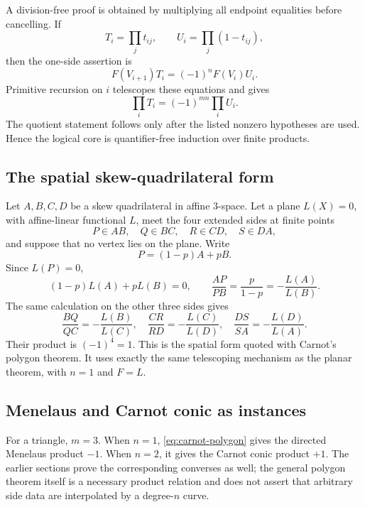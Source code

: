 A division-free proof is obtained by multiplying all endpoint equalities before
cancelling.  If
\[
 T_i=\prod_j t_{ij},\qquad U_i=\prod_j(1-t_{ij}),
\]
then the one-side assertion is
\[
 F(V_{i+1})T_i=(-1)^nF(V_i)U_i.
\]
Primitive recursion on $i$ telescopes these equations and gives
\[
 \prod_iT_i=(-1)^{mn}\prod_iU_i.
\]
The quotient statement follows only after the listed nonzero hypotheses are
used.  Hence the logical core is quantifier-free induction over finite
products.

\subsection{The spatial skew-quadrilateral form}

Let $A,B,C,D$ be a skew quadrilateral in affine $3$-space.  Let a plane
$L(X)=0$, with affine-linear functional $L$, meet the four extended sides at
finite points
\[
 P\in AB,
 \quad Q\in BC,
 \quad R\in CD,
 \quad S\in DA,
\]
and suppose that no vertex lies on the plane.  Write
\[
 P=(1-p)A+pB.
\]
Since $L(P)=0$,
\[
 (1-p)L(A)+pL(B)=0,
 \qquad
 \frac{AP}{PB}=\frac p{1-p}=-\frac{L(A)}{L(B)}.
\]
The same calculation on the other three sides gives
\[
 \frac{BQ}{QC}=-\frac{L(B)}{L(C)},\quad
 \frac{CR}{RD}=-\frac{L(C)}{L(D)},\quad
 \frac{DS}{SA}=-\frac{L(D)}{L(A)}.
\]
Their product is $(-1)^4=1$.  This is the spatial form quoted with Carnot's
polygon theorem.  It uses exactly the same telescoping mechanism as the planar
theorem, with $n=1$ and $F=L$.

\subsection{Menelaus and Carnot conic as instances}

For a triangle, $m=3$.  When $n=1$, \eqref{eq:carnot-polygon} gives the
directed Menelaus product $-1$.  When $n=2$, it gives the Carnot conic product
$+1$.  The earlier sections prove the corresponding converses as well; the
general polygon theorem itself is a necessary product relation and does not
assert that arbitrary side data are interpolated by a degree-$n$ curve.
